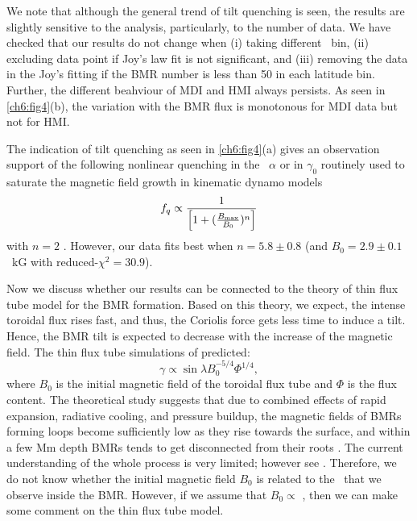  
We note that although the general trend of tilt quenching is seen, the results are slightly sensitive to the analysis, particularly, to the number of data.
We have checked that our results do not change when (i) taking different \Bmax\ bin, (ii) excluding data point if Joy's law fit
is not significant, and (iii) removing the data in the Joy's fitting if the BMR number is less than 50 in each latitude bin.
Further, the different beahviour of MDI and HMI always persists.
As seen in \autoref{ch6:fig4}(b), the variation with the BMR flux is monotonous for MDI data 
but not for HMI.


The indication of tilt quenching as seen in \autoref{ch6:fig4}(a) gives an observation
support of the following nonlinear quenching in the \bl\ $\alpha$
or in $\gamma_0$ routinely used to saturate the magnetic field growth in kinematic dynamo models \citep[e.g.,][]{Choudhuri1995,  Dikpati1999, Chatterjee2004, Karak2019}
\begin{equation}
f_q \propto \frac{1}{\left[1 + (\frac{B_{\rm max} }{ B_0})^n \right]} 
\end{equation}
with $n=2$ \citep[see for example, Equation 10 of][]{Karak2017}.
However, our data fits best when $n = 5.8 \pm 0.8$ (and $B_0 = 2.9 \pm 0.1$~kG with reduced-$\chi^2 = 30.9$).


Now we discuss whether our results can be connected to the theory of thin flux tube model for the BMR formation.
Based on this theory, we expect, the intense toroidal flux rises fast, and thus, the Coriolis force gets less time to induce a tilt. 
Hence, the BMR tilt is expected to decrease with the increase of the magnetic field. The thin flux tube simulations of \citet{Fan1994} predicted:
\begin{equation}
\gamma \propto \sin\lambda B_0^{-5/4}\Phi^{1/4},
\label{ch6:eq1}
\end{equation}
where $B_0$ is the initial magnetic field of the toroidal flux tube and
$\Phi$ is the flux content.
The theoretical study suggests that due to combined effects of rapid expansion, radiative cooling, and pressure buildup,
the magnetic fields of BMRs forming loops become sufficiently low as they rise towards the surface, and within a few Mm depth BMRs tends to get disconnected from their roots
\citep{Schuessler2005}. The current understanding of the whole process is 
very limited; however see \citet{Rempel2014a, Fan2014, Nelson2014}. Therefore, we do not know whether the initial magnetic field $B_0$ is related to 
the \Bmax\ that
we observe inside the BMR. 
However, if we assume that $B_0 \propto$ \Bmax, then we can make some comment on the thin flux tube model.


